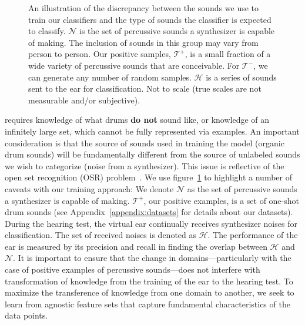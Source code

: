 \documentclass[runningheads,a4paper]{llncs}
\begin{document}
\begin{figure}[tbp]
    \begin{center}
    \end{center}
    \caption{ An illustration of the discrepancy between the sounds we use to train our classifiers and the type of sounds the classifier is expected to classify. $\mathcal{N}$ is the set of percussive sounds a synthesizer is capable of making. The inclusion of sounds in this group may vary from person to person. Our positive samples, $\mathcal{T^{+}}$, is a small fraction of a wide variety of percussive sounds that are conceivable. For $\mathcal{T^{-}}$, we can generate any number of random samples. $\mathcal{H}$ is a series of sounds sent to the ear for classification. Not to scale (true scales are not measurable and/or subjective). 
    }
\label{fig:ven_data}
\end{figure}
\descfirst requires knowledge of what drums \textbf{do not} sound like, or knowledge of an infinitely large set, which cannot be fully represented via examples. An important consideration is that the source of sounds used in training the model (organic drum sounds) will be fundamentally different from the source of unlabeled sounds we wish to categorize (noise from a synthesizer). This issue is reflective of the open set recognition (OSR) problem~\cite{geng2020recent,mundt2019open}. We use figure~\ref{fig:ven_data} to highlight a number of caveats with our training approach: We denote $\mathcal{N}$ as the set of percussive sounds a synthesizer is capable of making. $\mathcal{T^{+}}$, our positive examples, is a set of one-shot drum sounds (see Appendix~\ref{appendix:datasets} for details about our datasets). During the hearing test, the virtual ear continually receives synthesizer noises for classification. The set of received noises is denoted as $\mathcal{H}$. The performance of the ear is measured by its precision and recall in finding the overlap between $\mathcal{H}$ and $\mathcal{N}$. It is important to ensure that the change in domains---particularly with the case of positive examples of percussive sounds---does not interfere with transformation of knowledge from the training of the ear to the hearing test. To maximize the transference of knowledge from one domain to another, we seek to learn from agnostic feature sets that capture fundamental characteristics of the data points.
\end{document}
